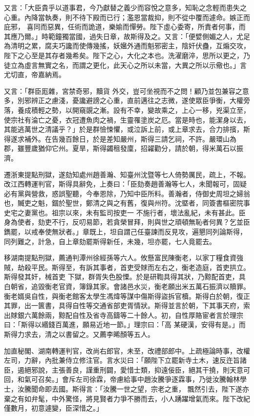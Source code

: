 \begin{pinyinscope}
 又言：「大臣貴乎以道事君，今乃獻替之義少而容悅之意多，知恥之念輕而患失之心重。內降當執奏，則不待下殿而已行；濫恩當裁抑，則不從中覆而遽命。嫉正而庇邪，
 喜同而惡異，任術而詭道，樂媮而憚勞。陛下虛心委寄，所責者何事，而其應乃爾。」時範鐘獨當國，過失日章，故斯得及之。又言：「便嬖側媚之人，尤足為清明之累，腐夫巧讒而使傳幾搖，妖㜮外通而魁邪密主，陰奸伏蠱，互煽交攻，陛下之心至是其存者幾希矣。陛下之心，大化之本也。洗濯磨淬，思所以更之，乃徒立為虛言無實之名，而謂之更化，此天心之所以未當，大異之所以示儆也。」言尤切直，帝嘉納焉。



 又言：「群臣厖雜，宮禁奇邪，黷貨
 外交，豈可坐視而不之問！顧乃並包兼容之意多，別邪辨正之慮淺，憂讒避謗之心重，直前邁往之志微，遂使眾臣爭衡，大權旁落，養成積輕之勢，以開窺覬之漸。設有不幸，變故乘之，上心一移，兇渠立至，使宗社有淪亡之憂，衣冠遭魚肉之禍，生靈罹塗炭之厄。當是時也，能潔身以去，其能逃萬世之清議乎？」於是群憸悚懼，或泣訴上前，或上章求去，合力排擯，斯得遂求補外。在告幾百餘日，於是差知嚴州，斯得三請乞祠，不許。嚴環山為
 郡，雖豐歲猶仰它州。夏旱，斯得蠲租發廩，招糴勸分，請於朝，得米萬石以振濟。



 遷浙東提點刑獄，遂劾知處州趙善瀚、知臺州沈暨等七人倚勢厲民，疏上，不報。改江西轉運判官，斯得具辭免，上奏曰：「臣劾奏趙善瀚等七人，未聞報可，固疑必有黨與營救，惑誤聖聽，今奉恩除，乃知中臣所料。善瀚者，侍御史周坦之婦翁也，贓吏之魁，錮於聖世，鄭清之與之有舊，復與州符。沈塈者，同簽書樞密院事史宅之妻黨也。祖宗以來，未有監司按吏一
 不施行者，壞法亂紀，未有甚此。臣身為使者，劾吏不行，反叨易節，若貪榮冒拜，則與世之頑頓無恥者何異？乞並臣鐫罷，以戒奉使無狀者。」章既上，坦自謂己任臺諫而反見攻，遍懇同列論斯得，同列難之，計急，自上章劾罷斯得新任，未幾，坦亦罷，七人竟罷去。



 移湖南提點刑獄，薦通判潭州徐經孫等六人。攸懸富民陳衡老，以家丁糧食資強賊，劫殺平民。斯得至，有訴其事者，首吏受賕而左右之，衡老造庭，首吏拱立。斯得發其奸，械首吏
 下獄，群胥失色股慄。於是研鞫具得其狀，乃黥配首吏，具白朝省，追毀衡老官資，簿錄其家。會諸邑水災，衡老願出米五萬石振濟以贖罪。衡老婿吳自性，與衡老館客太學生馮煒等謀中傷斯得盜拆官櫝。斯得白於朝，復正其罪，出一篋書，具得自性等交通省部吏胥情狀。斯得並言於朝，下其事天府，索出賕銀六萬餘兩，黥配自性及省寺高鑄等二十餘人。初，自性厚賂宦者言於理宗曰：「斯得以緡錢百萬進，願易近地一節。」理宗曰：「高
 某硬漢，安得有是。」而斯得力求去，清之以書留之。又薦李晞顏等五人。



 加直秘閣、湖南轉運判官，改尚右郎官，未至，改禮部郎中。上疏極論時事，改權左司，力辭，內批兼侍立修注官。言水災曰：「願陛下立罷新寺土木，速反迕旨諸臣，遏絕邪說，主張善良，謹重刑闢，愛惜士類，抑遠佞臣，絕其干撓，則天意可回，和氣可召矣。」會斥左司徐霖，帝慮給事中趙汝騰爭逐霖事，乃徙汝騰翰林學士，汝騰聞命即去國。斯得言：「汝騰一世之望，宗老之重，
 飄然引去，陛下遂亦棄之有如弁髦，中外驚怪，將見賢者力爭不勝而去，小人踴躍增氣而來。陛下改紀僅數月，初意遽變，臣深惜之。」




\end{pinyinscope}
